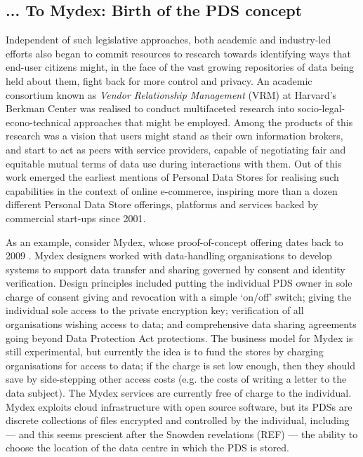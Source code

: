 \documentclass[runningheads,a4paper]{llncs}
\begin{document}
\subsection{... To Mydex: Birth of the PDS concept}

Independent of such legislative approaches, both academic and industry-led efforts also began to commit resources to research towards identifying ways that end-user citizens might, in the face of the vast growing repositories of data being held about them, fight back for more control and privacy. An academic consortium known as \emph{Vendor Relationship Management} (VRM) at Harvard's Berkman Center was realised to conduct multifaceted research into socio-legal-econo-technical approaches that might be employed.  Among the products of this research was a vision that users might stand as their own information brokers, and start to act as peers with service providers, capable of negotiating fair and equitable mutual terms of data use during interactions with them\cite{agustin2001vendor}.  Out of this work emerged the earliest mentions of Personal Data Stores for realising such capabilities in the context of online e-commerce, inspiring more than a dozen different Personal Data Store offerings, platforms and services backed by commercial start-ups since 2001\cite{ctrlshift-report}. 

As an example, consider Mydex, whose proof-of-concept offering dates back to 2009 \cite{}. Mydex designers worked with data-handling organisations to develop systems to support data transfer and sharing governed by consent and identity verification. Design principles included putting the individual PDS owner in sole charge of consent giving and revocation with a simple `on/off’ switch; giving the individual sole access to the private encryption key; verification of all organisations wishing access to data; and comprehensive data sharing agreements going beyond Data Protection Act protections. The business model for Mydex is still experimental, but currently the idea is to fund the stores by charging organisations for access to data; if the charge is set low enough, then they should save by side-stepping other access costs (e.g. the costs of writing a letter to the data subject). The Mydex services are currently free of charge to the individual. Mydex exploits cloud infrastructure with open source software, but  its PDSs are discrete collections of files encrypted and controlled by the individual, including --- and this seems prescient after the Snowden revelations (REF) --- the ability to choose the location of the data centre in which the PDS is stored.
\end{document}
